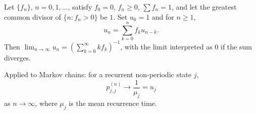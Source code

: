 Let $\{f_n\}$, $n = 0, 1, \ldots$, satisfy $f_0 = 0$, $f_n \geq 0$, $\sum f_n = 1$, and let the greatest common divisor of $\{n : f_n > 0\}$ be $1$. Set $u_0 = 1$ and for $n \geq 1$,
$$u_n = \sum_{k=0}^{n} f_k u_{n-k}.$$
Then $\lim_{n \to \infty} u_n = \left(\sum_{k=0}^{\infty} k f_k\right)^{-1}$, with the limit interpreted as $0$ if the sum diverges.

Applied to Markov chains: for a recurrent non-periodic state $j$,
$$p_{j,j}^{(n)} \to \frac{1}{\mu_j} = u_j$$
as $n \to \infty$, where $\mu_j$ is the mean recurrence time.
